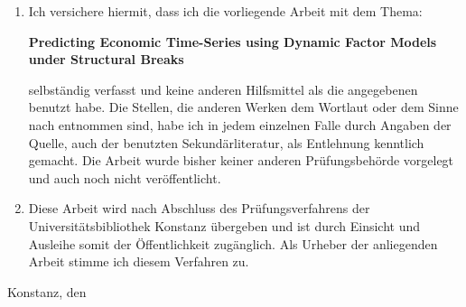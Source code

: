 \documentclass[12pt]{article}
\begin{document}
\raggedright
\begin{enumerate}
\item{ Ich versichere hiermit, dass ich die vorliegende Arbeit mit dem Thema: \\
\vspace{0.5cm}
\begin{center}
	\textbf{Predicting Economic Time-Series using Dynamic Factor Models under Structural Breaks}
\end{center}

selbständig verfasst und keine anderen Hilfsmittel als die angegebenen benutzt habe.
Die Stellen, die anderen Werken dem Wortlaut oder dem Sinne nach entnommen sind,
habe ich in jedem einzelnen Falle durch Angaben der Quelle, auch der benutzten
Sekundärliteratur, als Entlehnung kenntlich gemacht. Die Arbeit wurde bisher keiner
anderen Prüfungsbehörde vorgelegt und auch noch nicht veröffentlicht.}

\item{Diese Arbeit wird nach Abschluss des Prüfungsverfahrens der Universitätsbibliothek
Konstanz übergeben und ist durch Einsicht und Ausleihe somit der Öffentlichkeit
zugänglich. Als Urheber der anliegenden Arbeit stimme ich diesem Verfahren zu.}
\end{enumerate}

\vspace{1cm}
Konstanz, den \underline{\hspace{3.3cm}} \hspace{3cm} \underline{\hspace{6cm}}
\end{document}
